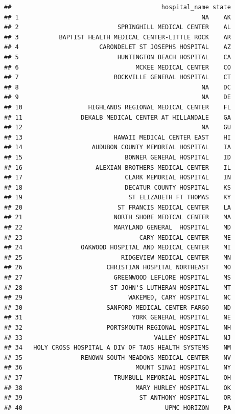 \documentclass[
]{book}
\theoremstyle{definition}
\theoremstyle{definition}
\theoremstyle{definition}
\theoremstyle{definition}
\theoremstyle{remark}
\begin{document}
\begin{verbatim}
##                                         hospital_name state
## 1                                                  NA    AK
## 2                           SPRINGHILL MEDICAL CENTER    AL
## 3           BAPTIST HEALTH MEDICAL CENTER-LITTLE ROCK    AR
## 4                      CARONDELET ST JOSEPHS HOSPITAL    AZ
## 5                           HUNTINGTON BEACH HOSPITAL    CA
## 6                                MCKEE MEDICAL CENTER    CO
## 7                          ROCKVILLE GENERAL HOSPITAL    CT
## 8                                                  NA    DC
## 9                                                  NA    DE
## 10                  HIGHLANDS REGIONAL MEDICAL CENTER    FL
## 11                DEKALB MEDICAL CENTER AT HILLANDALE    GA
## 12                                                 NA    GU
## 13                         HAWAII MEDICAL CENTER EAST    HI
## 14                   AUDUBON COUNTY MEMORIAL HOSPITAL    IA
## 15                            BONNER GENERAL HOSPITAL    ID
## 16                    ALEXIAN BROTHERS MEDICAL CENTER    IL
## 17                            CLARK MEMORIAL HOSPITAL    IN
## 18                            DECATUR COUNTY HOSPITAL    KS
## 19                             ST ELIZABETH FT THOMAS    KY
## 20                          ST FRANCIS MEDICAL CENTER    LA
## 21                         NORTH SHORE MEDICAL CENTER    MA
## 22                         MARYLAND GENERAL  HOSPITAL    MD
## 23                                CARY MEDICAL CENTER    ME
## 24                OAKWOOD HOSPITAL AND MEDICAL CENTER    MI
## 25                           RIDGEVIEW MEDICAL CENTER    MN
## 26                       CHRISTIAN HOSPITAL NORTHEAST    MO
## 27                         GREENWOOD LEFLORE HOSPITAL    MS
## 28                        ST JOHN'S LUTHERAN HOSPITAL    MT
## 29                             WAKEMED, CARY HOSPITAL    NC
## 30                       SANFORD MEDICAL CENTER FARGO    ND
## 31                              YORK GENERAL HOSPITAL    NE
## 32                       PORTSMOUTH REGIONAL HOSPITAL    NH
## 33                                    VALLEY HOSPITAL    NJ
## 34   HOLY CROSS HOSPITAL A DIV OF TAOS HEALTH SYSTEMS    NM
## 35                RENOWN SOUTH MEADOWS MEDICAL CENTER    NV
## 36                               MOUNT SINAI HOSPITAL    NY
## 37                         TRUMBULL MEMORIAL HOSPITAL    OH
## 38                               MARY HURLEY HOSPITAL    OK
## 39                                ST ANTHONY HOSPITAL    OR
## 40                                       UPMC HORIZON    PA

\end{verbatim}
\end{document}
